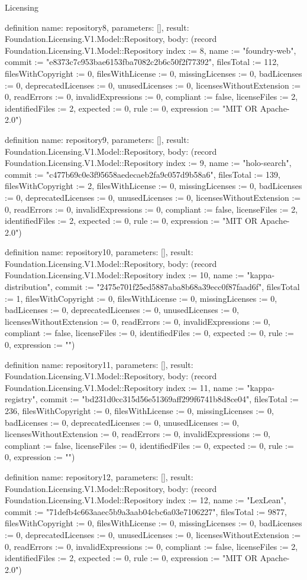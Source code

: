 \begin{lexlean}{Licensing}
\begin{semanticmodule}
definition{
  name: repository8,
  parameters: [],
  result: Foundation.Licensing.V1.Model::Repository,
  body: (record Foundation.Licensing.V1.Model::Repository {index := 8, name := "foundry-web", commit := "e8373c7c953bae6153fba7082c2b6c50f2f77392", filesTotal := 112, filesWithCopyright := 0, filesWithLicense := 0, missingLicenses := 0, badLicenses := 0, deprecatedLicenses := 0, unusedLicenses := 0, licensesWithoutExtension := 0, readErrors := 0, invalidExpressions := 0, compliant := false, licenseFiles := 2, identifiedFiles := 2, expected := 0, rule := 0, expression := "MIT OR Apache-2.0"})
}

definition{
  name: repository9,
  parameters: [],
  result: Foundation.Licensing.V1.Model::Repository,
  body: (record Foundation.Licensing.V1.Model::Repository {index := 9, name := "holo-search", commit := "c477b69c0e3f95658aedecaeb2fa9c057d9b58a6", filesTotal := 139, filesWithCopyright := 2, filesWithLicense := 0, missingLicenses := 0, badLicenses := 0, deprecatedLicenses := 0, unusedLicenses := 0, licensesWithoutExtension := 0, readErrors := 0, invalidExpressions := 0, compliant := false, licenseFiles := 2, identifiedFiles := 2, expected := 0, rule := 0, expression := "MIT OR Apache-2.0"})
}

definition{
  name: repository10,
  parameters: [],
  result: Foundation.Licensing.V1.Model::Repository,
  body: (record Foundation.Licensing.V1.Model::Repository {index := 10, name := "kappa-distribution", commit := "2475e701f25ed5887aba8b68a39ecc0f87faad6f", filesTotal := 1, filesWithCopyright := 0, filesWithLicense := 0, missingLicenses := 0, badLicenses := 0, deprecatedLicenses := 0, unusedLicenses := 0, licensesWithoutExtension := 0, readErrors := 0, invalidExpressions := 0, compliant := false, licenseFiles := 0, identifiedFiles := 0, expected := 0, rule := 0, expression := ""})
}

definition{
  name: repository11,
  parameters: [],
  result: Foundation.Licensing.V1.Model::Repository,
  body: (record Foundation.Licensing.V1.Model::Repository {index := 11, name := "kappa-registry", commit := "bd231d0cc315d56e51369aff299f6741b8d8ce04", filesTotal := 236, filesWithCopyright := 0, filesWithLicense := 0, missingLicenses := 0, badLicenses := 0, deprecatedLicenses := 0, unusedLicenses := 0, licensesWithoutExtension := 0, readErrors := 0, invalidExpressions := 0, compliant := false, licenseFiles := 0, identifiedFiles := 0, expected := 0, rule := 0, expression := ""})
}

definition{
  name: repository12,
  parameters: [],
  result: Foundation.Licensing.V1.Model::Repository,
  body: (record Foundation.Licensing.V1.Model::Repository {index := 12, name := "LexLean", commit := "71defb4c663aaec5b9a3aab04cbc6a03e7106227", filesTotal := 9877, filesWithCopyright := 0, filesWithLicense := 0, missingLicenses := 0, badLicenses := 0, deprecatedLicenses := 0, unusedLicenses := 0, licensesWithoutExtension := 0, readErrors := 0, invalidExpressions := 0, compliant := false, licenseFiles := 2, identifiedFiles := 2, expected := 0, rule := 0, expression := "MIT OR Apache-2.0"})
}


\end{semanticmodule}
\end{lexlean}
